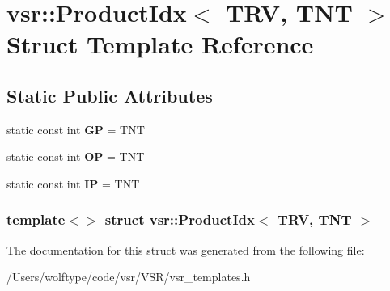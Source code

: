 \hypertarget{structvsr_1_1_product_idx_3_01_t_r_v_00_01_t_n_t_01_4}{\section{vsr\-:\-:Product\-Idx$<$ T\-R\-V, T\-N\-T $>$ Struct Template Reference}
\label{structvsr_1_1_product_idx_3_01_t_r_v_00_01_t_n_t_01_4}
}
\subsection*{Static Public Attributes}
\begin{DoxyCompactItemize}
\item 
\hypertarget{structvsr_1_1_product_idx_3_01_t_r_v_00_01_t_n_t_01_4_ada4e01c7dadcf04e2afe1cd43c19825c}{static const int {\bfseries G\-P} = T\-N\-T}\label{structvsr_1_1_product_idx_3_01_t_r_v_00_01_t_n_t_01_4_ada4e01c7dadcf04e2afe1cd43c19825c}

\item 
\hypertarget{structvsr_1_1_product_idx_3_01_t_r_v_00_01_t_n_t_01_4_a58e2e62b49d69c511b719e97864b96bc}{static const int {\bfseries O\-P} = T\-N\-T}\label{structvsr_1_1_product_idx_3_01_t_r_v_00_01_t_n_t_01_4_a58e2e62b49d69c511b719e97864b96bc}

\item 
\hypertarget{structvsr_1_1_product_idx_3_01_t_r_v_00_01_t_n_t_01_4_a6e4cdf39ea8d0eef2ae838c8a90494f8}{static const int {\bfseries I\-P} = T\-N\-T}\label{structvsr_1_1_product_idx_3_01_t_r_v_00_01_t_n_t_01_4_a6e4cdf39ea8d0eef2ae838c8a90494f8}

\end{DoxyCompactItemize}
\subsubsection*{template$<$$>$ struct vsr\-::\-Product\-Idx$<$ T\-R\-V, T\-N\-T $>$}



The documentation for this struct was generated from the following file\-:\begin{DoxyCompactItemize}
\item 
/\-Users/wolftype/code/vsr/\-V\-S\-R/vsr\-\_\-templates.\-h\end{DoxyCompactItemize}

